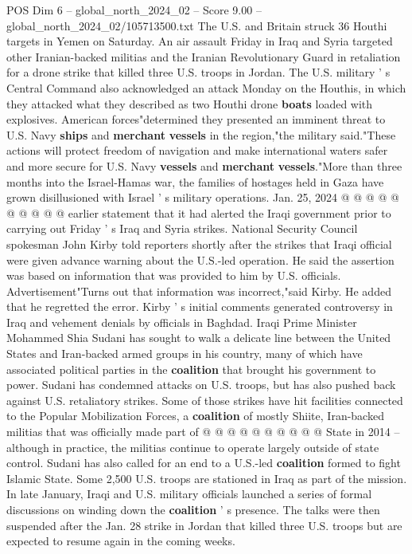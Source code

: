 \begin{textsample}{POS Dim 6 – global\_north\_2024\_02 – Score 9.00 – global\_north\_2024\_02/105713500.txt}
The U.S. and Britain struck 36 Houthi targets in Yemen on Saturday.
An air assault Friday in Iraq and Syria targeted other Iranian-backed militias and the Iranian Revolutionary Guard in retaliation for a drone strike that killed three U.S. troops in Jordan.
The U.S. military ' s Central Command also acknowledged an attack Monday on the Houthis, in which they attacked what they described as two Houthi drone \textbf{boats} loaded with explosives.
American forces"determined they presented an imminent threat to U.S.
Navy \textbf{ships} and \textbf{merchant} \textbf{vessels} in the region,"the military said."These actions will protect freedom of navigation and make international waters safer and more secure for U.S.
Navy \textbf{vessels} and \textbf{merchant} \textbf{vessels}."More than three months into the Israel-Hamas war, the families of hostages held in Gaza have grown disillusioned with Israel ' s military operations.
Jan. 25, 2024 @ @ @ @ @ @ @ @ @ @ earlier statement that it had alerted the Iraqi government prior to carrying out Friday ' s Iraq and Syria strikes.
National Security Council spokesman John Kirby told reporters shortly after the strikes that Iraqi official were given advance warning about the U.S.-led operation.
He said the assertion was based on information that was provided to him by U.S. officials.
Advertisement"Turns out that information was incorrect,"said Kirby.
He added that he regretted the error.
Kirby ' s initial comments generated controversy in Iraq and vehement denials by officials in Baghdad.
Iraqi Prime Minister Mohammed Shia Sudani has sought to walk a delicate line between the United States and Iran-backed armed groups in his country, many of which have associated political parties in the \textbf{coalition} that brought his government to power.
Sudani has condemned attacks on U.S. troops, but has also pushed back against U.S. retaliatory strikes.
Some of those strikes have hit facilities connected to the Popular Mobilization Forces, a \textbf{coalition} of mostly Shiite, Iran-backed militias that was officially made part of @ @ @ @ @ @ @ @ @ @ State in 2014 -- although in practice, the militias continue to operate largely outside of state control.
Sudani has also called for an end to a U.S.-led \textbf{coalition} formed to fight Islamic State.
Some 2,500 U.S. troops are stationed in Iraq as part of the mission.
In late January, Iraqi and U.S. military officials launched a series of formal discussions on winding down the \textbf{coalition} ' s presence.
The talks were then suspended after the Jan. 28 strike in Jordan that killed three U.S. troops but are expected to resume again in the coming weeks.

\end{textsample}
